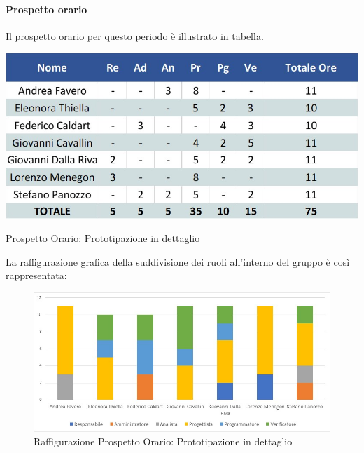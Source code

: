 \paragraph{Prospetto orario}
Il prospetto orario per questo periodo è illustrato in tabella.
\begin{table}[H]
	\centerline{\includegraphics[scale=0.7]{img/Preventivo/PrototipazioneDettaglioOrario.jpg}}
	\caption{Prospetto Orario: Prototipazione in dettaglio}
	\clearpage
\end{table}
La raffigurazione grafica della suddivisione dei ruoli all'interno del gruppo è così rappresentata: 
\begin{figure}[H]
	\centerline{\includegraphics[scale=0.85]{img/Preventivo/Istogrammi/PrototipazioneDettaglio.jpg}}
	\caption{Raffigurazione Prospetto Orario: Prototipazione in dettaglio}
	\clearpage
\end{figure}
\newpage
